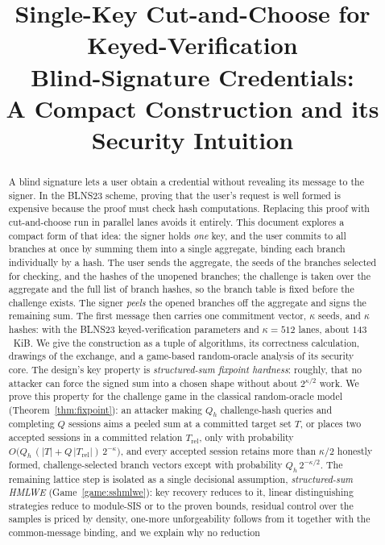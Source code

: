 \documentclass[11pt]{article}
\title{Single-Key Cut-and-Choose for Keyed-Verification\\
Blind-Signature Credentials:\\A Compact Construction and its Security Intuition}
\author{}
\date{}
\begin{document}
\maketitle

\begin{abstract}
A blind signature lets a user obtain a credential without revealing its
message to the signer.  In the BLNS23 scheme, proving that the user's request
is well formed is expensive because the proof must check hash computations.
Replacing this proof with cut-and-choose run in parallel lanes avoids it
entirely.  This document explores a compact form of that idea: the signer
holds \emph{one} key, and the user commits to all branches at once by summing
them into a single aggregate, binding each branch individually by a hash.
The user sends the aggregate, the seeds of the branches selected for
checking, and the hashes of the unopened branches; the challenge is taken
over the aggregate and the full list of branch hashes, so the branch table is
fixed before the challenge exists.  The signer \emph{peels} the opened
branches off the aggregate and signs the remaining sum.  The first message
then carries one commitment vector, $\kappa$ seeds, and $\kappa$ hashes:
with the BLNS23 keyed-verification parameters and $\kappa=512$ lanes, about
$143$~KiB.  We give the construction as a tuple of algorithms, its
correctness calculation, drawings of the exchange, and a game-based
random-oracle analysis of its security core.  The design's key property is
\emph{structured-sum fixpoint hardness}: roughly, that no attacker can force
the signed sum into a chosen shape without about $2^{\kappa/2}$ work.  We
prove this property for the challenge game in the classical random-oracle
model (Theorem~\ref{thm:fixpoint}): an attacker making $Q_h$ challenge-hash
queries and completing $Q$ sessions aims a peeled sum at a committed target
set $T$, or places two accepted sessions in a committed relation
$T_{\mathrm{rel}}$, only with probability
$O\bigl(Q_h\,(|T|+Q\,|T_{\mathrm{rel}}|)\,2^{-\kappa}\bigr)$, and every
accepted session retains more than $\kappa/2$ honestly formed,
challenge-selected branch vectors except with probability
$Q_h\,2^{-\kappa/2}$.  The remaining lattice step is isolated as a single
decisional assumption, \emph{structured-sum HMLWE}
(Game~\ref{game:sshmlwe}): key recovery reduces to it, linear distinguishing
strategies reduce to module-SIS or to the proven bounds, residual control
over the samples is priced by density, one-more unforgeability follows from
it together with the common-message binding, and we explain why no reduction

\end{abstract}
\end{document}
